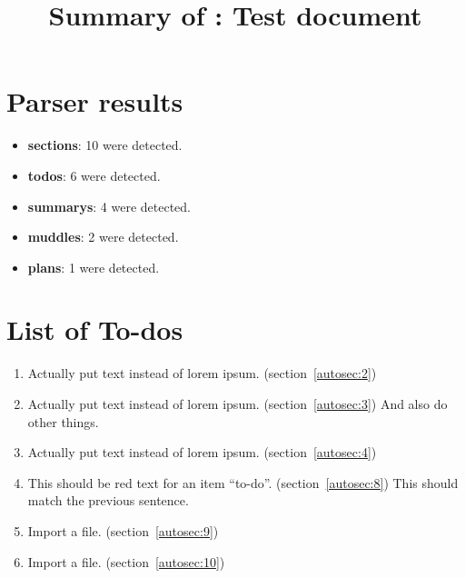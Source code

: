 \title{Summary of : Test document}
\maketitle

\section{Parser results}
    \begin{itemize}[noitemsep]
\item \textbf{sections}: 10 were detected.
\item \textbf{todos}: 6 were detected.
\item \textbf{summarys}: 4 were detected.
\item \textbf{muddles}: 2 were detected.
\item \textbf{plans}: 1 were detected.
    \end{itemize}

\section{List of To-dos}
    \begin{enumerate}[noitemsep]
        \item {\color{red}Actually put text instead of lorem ipsum.} (section~\ref{autosec:2})
        \item {\color{red}Actually put text instead of lorem ipsum.} (section~\ref{autosec:3})
{\color{red}And also do other things.}
        \item {\color{red}Actually put text instead of lorem ipsum.} (section~\ref{autosec:4})
        \item {\color{red}This should be red text for an item ``to-do''.} (section~\ref{autosec:8})
{\color{red}This should match the previous sentence.}
        \item {\color{red}Import a file.} (section~\ref{autosec:9})
        \item {\color{red}Import a file.} (section~\ref{autosec:10})
    \end{enumerate}

